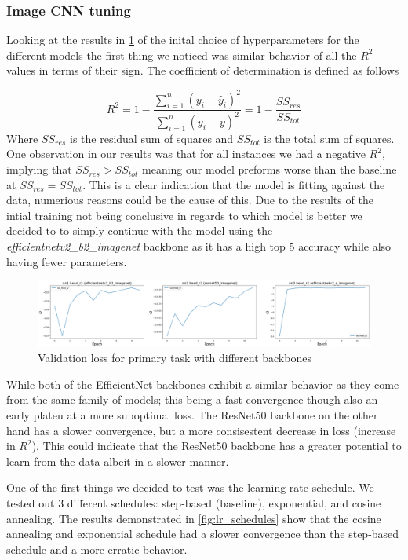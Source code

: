 \documentclass[12pt,a4paper,oneside]{article}
\begin{document}
\subsubsection{Image CNN tuning}

Looking at the results in \ref{fig:different_backbones} of the inital choice of hyperparameters for the different models the first thing we noticed was similar behavior of all the $R^2$ values in terms of their sign. The coefficient of determination is defined as follows 

\[
    R^2 = 1 - \frac{\sum_{i=1}^{n} (y_i - \hat{y}_i)^2}{\sum_{i=1}^{n} (y_i - \bar{y})^2} = 1 - \frac{SS_{res}}{SS_{tot}}  
\]
Where $SS_{res}$ is the residual sum of squares and $SS_{tot}$ is the total sum of squares. One observation in our results was that for all instances we had a negative $R^2$, implying that $SS_{res} > SS_{tot}$ meaning our model preforms worse than the baseline at $SS_{res} = SS_{tot}$. This is a clear indication that the model is fitting against the data, numerious reasons could be the cause of this. Due to the results of the intial training not being conclusive in regards to which model is better we decided to to simply continue with the model using the \textit{efficientnetv2\_b2\_imagenet} backbone as it has a high top 5 accuracy while also having fewer parameters.

\begin{figure}[!h]
    \centering
    \includegraphics[width=1\textwidth]{assets/different_backbones.png}
    \caption{Validation loss for primary task with different backbones}
    \label{fig:different_backbones}
\end{figure}

While both of the EfficientNet backbones exhibit a similar behavior as they come from the same family of models; this being a fast convergence though also an early plateu at a more suboptimal loss. The ResNet50 backbone on the other hand has a slower convergence, but a more consisestent decrease in loss (increase in $R^2$). This could indicate that the ResNet50 backbone has a greater potential to learn from the data albeit in a slower manner. 

\smallskip 
One of the first things we decided to test was the learning rate schedule. We tested out 3 different schedules: step-based (baseline), exponential, and cosine annealing. The results demonstrated in \ref{fig:lr_schedules} show that the cosine annealing and exponential schedule had a slower convergence than the step-based schedule and a more erratic behavior.  
\end{document}
